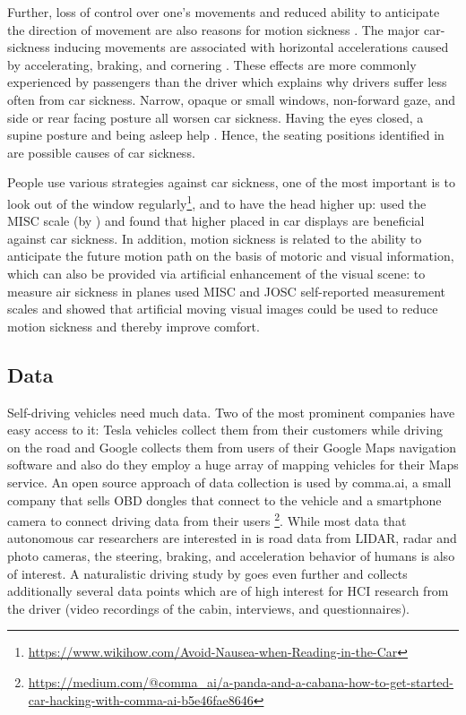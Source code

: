 Further, loss of control over one’s movements and reduced ability to anticipate the direction of movement are also reasons for motion sickness \citep{Sivak2015}. The major car-sickness inducing movements are associated with horizontal accelerations caused by accelerating, braking, and cornering \citep{Diels2016}. These effects are more commonly experienced by passengers than the driver which explains why drivers suffer less often from car sickness. Narrow, opaque or small windows, non-forward gaze, and side or rear facing posture all worsen car sickness. Having the eyes closed, a supine posture and being asleep help \citep{Sivak2015}. Hence, the seating positions identified in \emph{} are possible causes of car sickness. 

People use various strategies against car sickness, one of the most important is to look out of the window regularly\footnote{\url{https://www.wikihow.com/Avoid-Nausea-when-Reading-in-the-Car}}, and to have the head higher up: \citet{Kuiper2018LookingCarsickness} used the MISC scale (by \citet{Bos2005MotionView}) and found that higher placed in car displays are beneficial against car sickness. In addition, motion sickness is related to the ability to anticipate the future motion path on the basis of motoric and visual information, which can also be provided via artificial enhancement of the visual scene: to measure air sickness in planes \cite{Feenstra2011AAirsickness} used MISC and JOSC self-reported measurement scales and showed that artificial moving visual images could be used to reduce motion sickness and thereby improve comfort.

\subsection{Data}
\label{sec:Data}
Self-driving vehicles need much data. Two of the most prominent companies have easy access to it: Tesla vehicles collect them from their customers while driving on the road and Google collects them from users of their Google Maps navigation software and also do they employ a huge array of mapping vehicles for their Maps service. An open source approach of data collection is used by comma.ai, a small company that sells OBD dongles that connect to the vehicle and a smartphone camera to connect driving data from their users \footnote{\url{https://medium.com/@comma_ai/a-panda-and-a-cabana-how-to-get-started-car-hacking-with-comma-ai-b5e46fae8646}}. While most data that autonomous car researchers are interested in is road data from LIDAR, radar and photo cameras, the steering, braking, and acceleration behavior of humans is also of interest. A naturalistic driving study by \citet{Fridman2017MITAutomation} goes even further and collects additionally several data points which are of high interest for HCI research from the driver (video recordings of the cabin, interviews, and questionnaires). 

